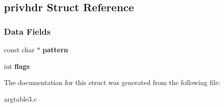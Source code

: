 \hypertarget{structprivhdr}{}\subsection{privhdr Struct Reference}
\label{structprivhdr}
\subsubsection*{Data Fields}
\begin{DoxyCompactItemize}
\item 
\mbox{\label{structprivhdr_af3739fb1871f5fed122dfcc86263b99f}} 
const char $\ast$ {\bfseries pattern}
\item 
\mbox{\label{structprivhdr_af26cfd6c6c4e74efcb95e39dd2dc89da}} 
int {\bfseries flags}
\end{DoxyCompactItemize}


The documentation for this struct was generated from the following file\+:\begin{DoxyCompactItemize}
\item 
argtable3.\+c\end{DoxyCompactItemize}
